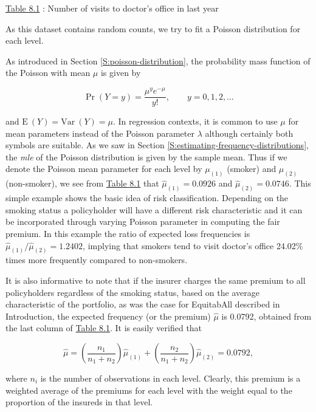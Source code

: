 \documentclass[]{book}
\theoremstyle{definition}
\theoremstyle{definition}
\theoremstyle{definition}
\theoremstyle{remark}
\begin{document}
\protect\hyperlink{tab:8.1}{Table 8.1} : Number of visits to doctor's
office in last year

As this dataset contains random counts, we try to fit a Poisson
distribution for each level.

As introduced in Section \ref{S:poisson-distribution}, the probability
mass function of the Poisson with mean \(\mu\) is given by

\begin{equation}
\Pr(Y=y)=\frac{\mu^y e^{-\mu}}{y!},\qquad y=0,1,2, \ldots
\label{eq:Pois-pmf}
\end{equation}

and \(\mathrm{E~}{(Y)}=\mathrm{Var~}{(Y)}=\mu\). In regression contexts,
it is common to use \(\mu\) for mean parameters instead of the Poisson
parameter \(\lambda\) although certainly both symbols are suitable. As
we saw in Section \ref{S:estimating-frequency-distributions}, the
\emph{mle} of the Poisson distribution is given by the sample mean. Thus
if we denote the Poisson mean parameter for each level by \(\mu_{(1)}\)
(smoker) and \(\mu_{(2)}\) (non-smoker), we see from
\protect\hyperlink{tab:8.1}{Table 8.1} that \(\hat{\mu}_{(1)}=0.0926\)
and \(\hat{\mu}_{(2)}=0.0746\). This simple example shows the basic idea
of risk classification. Depending on the smoking status a policyholder
will have a different risk characteristic and it can be incorporated
through varying Poisson parameter in computing the fair premium. In this
example the ratio of expected loss frequencies is
\(\hat{\mu}_{(1)}/\hat{\mu}_{(2)}=1.2402\), implying that smokers tend
to visit doctor's office 24.02\(\%\) times more frequently compared to
non-smokers.

It is also informative to note that if the insurer charges the same
premium to all policyholders regardless of the smoking status, based on
the average characteristic of the portfolio, as was the case for
EquitabAll described in Introduction, the expected frequency (or the
premium) \(\hat{\mu}\) is 0.0792, obtained from the last column of
\protect\hyperlink{tab:8.1}{Table 8.1}. It is easily verified that

\begin{equation}
\hat{\mu} = \left(\frac{n_1}{n_1+n_2}\right)\hat{\mu}_{(1)}+\left(\frac{n_2}{n_1+n_2}\right)\hat{\mu}_{(2)}=0.0792,
\label{eq:coll-prem-avg}
\end{equation}

where \(n_i\) is the number of observations in each level. Clearly, this
premium is a weighted average of the premiums for each level with the
weight equal to the proportion of the insureds in that level.
\end{document}
